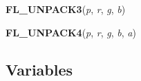 \hspace{.8\funcindent}\begin{boxedminipage}{\funcwidth}

    \raggedright \textbf{FL\_UNPACK3}(\textit{p}, \textit{r}, \textit{g}, \textit{b})

\setlength{\parskip}{2ex}
\setlength{\parskip}{1ex}
    \end{boxedminipage}

    \label{xformslib:flxbasic:FL_UNPACK4}

    \vspace{0.5ex}

\hspace{.8\funcindent}\begin{boxedminipage}{\funcwidth}

    \raggedright \textbf{FL\_UNPACK4}(\textit{p}, \textit{r}, \textit{g}, \textit{b}, \textit{a})

\setlength{\parskip}{2ex}
\setlength{\parskip}{1ex}
    \end{boxedminipage}



  \subsection{Variables}

